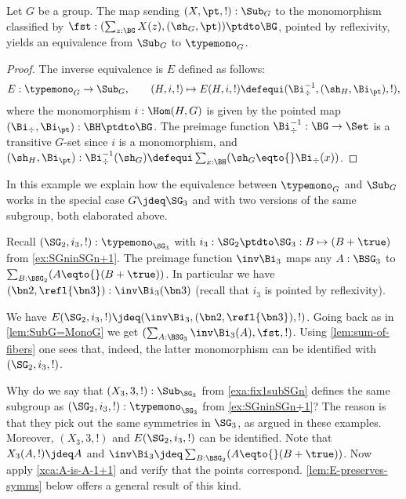 \begin{lemma}\label{lem:SubG=MonoG}
  Let $G$ be a group.
  The map sending $(X,\pt,!) : \Sub_G$ to the monomorphism classified by  
  $\fst: (\sum_{z:\BG}X(z),(\sh_G,\pt))\ptdto\BG$, pointed by
  reflexivity, yields an equivalence from $\Sub_G$ to $\typemono_G$.
\end{lemma}

\begin{proof}
   The inverse equivalence is $E$ defined as follows:
 $$E:\typemono_G\to\Sub_G,\qquad 
   (H,i,!)\mapsto E(H,i,!)\defequi (\Bi_\div^{-1},(\sh_H,\Bi_\pt),!),$$
  where the monomorphism $i:\Hom(H,G)$ is given by 
  the pointed map $(\Bi_\div,\Bi_\pt):\BH\ptdto\BG$.
  The preimage function $\Bi_\div^{-1}:\BG\to\Set$ is a transitive $G$-set 
  since $i$ is a monomorphism, and $(\sh_H,\Bi_\pt):\Bi_\div^{-1}(\sh_G)
  \defequi \sum_{x:\BH}(\sh_G\eqto{}\Bi_\div(x))$.
\end{proof}

 \begin{example}\label{exa:EforSG3}
  In this example we explain how the equivalence between
  $\typemono_G$ and $\Sub_G$ works in the special case
  $G\jdeq\SG_3$ and with two versions of the same subgroup,
  both elaborated above.
  
  Recall $(\SG_2,i_3,!):\typemono_{\SG_3}$ with
  $i_3: \SG_2\ptdto\SG_3 : B\mapsto (B+\true)$ from \cref{ex:SGninSGn+1}.
  The preimage function $\inv\Bi_3$ maps any $A:\BSG_3$
  to $\sum_{B:\BSG_2}(A\eqto{}(B+\true))$.
  In particular we have $(\bn2,\refl{\bn3}):\inv\Bi_3(\bn3)$
  (recall that $i_3$ is pointed by reflexivity).
   
  We have $E(\SG_2,i_3,!)\jdeq(\inv\Bi_3,(\bn2,\refl{\bn3}),!)$.
  Going back as in \cref{lem:SubG=MonoG} we get 
  $(\sum_{A:\BSG_3}\inv\Bi_3(A),\fst,!)$. Using \cref{lem:sum-of-fibers}
  one sees that, indeed, the latter monomorphism 
  can be identified with $(\SG_2,i_3,!)$.
  
  Why do we say that $(X_3,3,!):\Sub_{\SG_3}$ from \cref{exa:fix1subSGn}
  defines the same subgroup as $(\SG_2,i_3,!):\typemono_{\SG_3}$
  from \cref{ex:SGninSGn+1}? The reason is that they pick out
  the same symmetries in $\SG_3$, as argued in these examples.
  Moreover, $(X_3,3,!)$ and $E(\SG_2,i_3,!)$ can be identified.
  Note that $X_3(A,!) \jdeq A$ and 
  $\inv\Bi_3 \jdeq \sum_{B:\BSG_2}(A\eqto{}(B+\true))$.
  Now apply \cref{xca:A-is-A-1+1} and verify that the points correspond.
  \cref{lem:E-preserves-symms} below offers a general result of this kind.
  \end{example}

